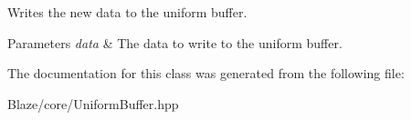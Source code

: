 Writes the new data to the uniform buffer. 


\begin{DoxyParams}{Parameters}
{\em data} & The data to write to the uniform buffer. \\
\hline
\end{DoxyParams}


The documentation for this class was generated from the following file\+:\begin{DoxyCompactItemize}
\item 
Blaze/core/Uniform\+Buffer.\+hpp\end{DoxyCompactItemize}
